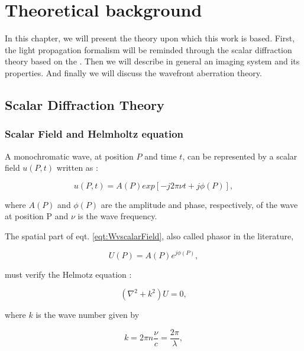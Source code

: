 
\chapter{Theoretical background} 
\label{ch:THback}

In this chapter, we will present the theory upon which this work is based. First, the light propagation formalism will be reminded through the scalar diffraction theory based on the \citet{goodman_1968}. Then we will describe in general an imaging system and its properties. And finally we will discuss the wavefront aberration theory.

\section{Scalar Diffraction Theory}
\label{sec:ScaDifTh}

\subsection{Scalar Field and Helmholtz equation}
\label{subsec:ScalF_HelmEqt}

A monochromatic wave, at position $P$ and time $t$, can be represented by a scalar field $u(P,t)$ written as :

\begin{equation}
u(P,t) =  A(P) exp\left[-j2\pi\nu t + j\phi(P)\right],
\label{eqt:WvscalarField}
\end{equation}

where $A(P)$ and $\phi(P)$ are the amplitude and phase, respectively, of the wave at position P and $\nu$ is the wave frequency.

The spatial part of eqt. \eqref{eqt:WvscalarField}, also called  phasor  in the literature, 

\begin{equation}
U(P) = A(P)e^{j\phi(P)},
\label{eqt:phasor}
\end{equation}

must verify the Helmotz equation : 

\begin{equation}
(\nabla^2 + k^2)U = 0,
\label{eqt:HelmholtzEqt}
\end{equation}

where $k$ is the wave number given by

\begin{equation}
k = 2\pi n \frac{\nu}{c} = \frac{2\pi}{\lambda},
\label{eqt:wavenumber}
\end{equation}

